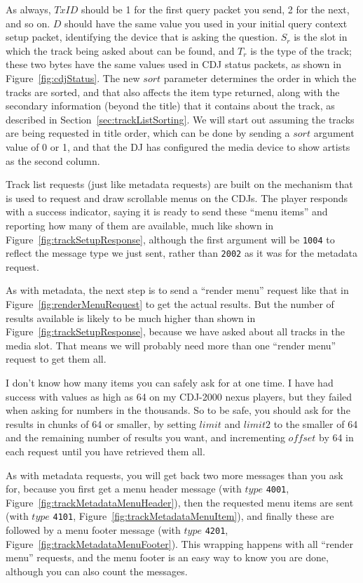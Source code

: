 \documentclass[11pt]{article}
\begin{document}
As always, $TxID$ should be 1 for the first query packet you send, 2
for the next, and so on. $D$ should have the same value you used in
your initial query context setup packet, identifying the device that
is asking the question. $S_r$ is the slot in which the track being
asked about can be found, and $T_r$ is the type of the track; these
two bytes have the same values used in CDJ status packets, as shown in
Figure~\ref{fig:cdjStatus}. The new $sort$ parameter determines the
order in which the tracks are sorted, and that also affects the item
type returned, along with the secondary information (beyond the title)
that it contains about the track, as described in
Section~\ref{sec:trackListSorting}. We will start out assuming the
tracks are being requested in title order, which can be done by
sending a $sort$ argument value of 0 or 1, and that the DJ has
configured the media device to show artists as the second column.

Track list requests (just like metadata requests) are built on the
mechanism that is used to request and draw scrollable menus on the
CDJs. The player responds with a success indicator, saying it is ready
to send these ``menu items'' and reporting how many of them are
available, much like shown in Figure~\ref{fig:trackSetupResponse},
although the first argument will be {\tt 1004} to reflect the
message type we just sent, rather than {\tt 2002} as it was for the
metadata request.

As with metadata, the next step is to send a ``render menu'' request
like that in Figure~\ref{fig:renderMenuRequest} to get the actual
results. But the number of results available is likely to be much
higher than shown in Figure~\ref{fig:trackSetupResponse}, because we
have asked about all tracks in the media slot. That means we will
probably need more than one ``render menu'' request to get them all.

I don't know how many items you can safely ask for at one time. I have
had success with values as high as 64 on my CDJ-2000 nexus players,
but they failed when asking for numbers in the thousands. So to be
safe, you should ask for the results in chunks of 64 or smaller, by
setting $limit$ and $limit2$ to the smaller of 64 and the remaining
number of results you want, and incrementing $offset$ by 64 in each
request until you have retrieved them all.

As with metadata requests, you will get back two more messages than
you ask for, because you first get a menu header message (with $type$
{\tt 4001}, Figure~\ref{fig:trackMetadataMenuHeader}), then the
requested menu items are sent (with $type$ {\tt 4101},
Figure~\ref{fig:trackMetadataMenuItem}), and finally these are
followed by a menu footer message (with $type$ {\tt 4201},
Figure~\ref{fig:trackMetadataMenuFooter}). This wrapping happens with
all ``render menu'' requests, and the menu footer is an easy way to
know you are done, although you can also count the messages.
\end{document}
